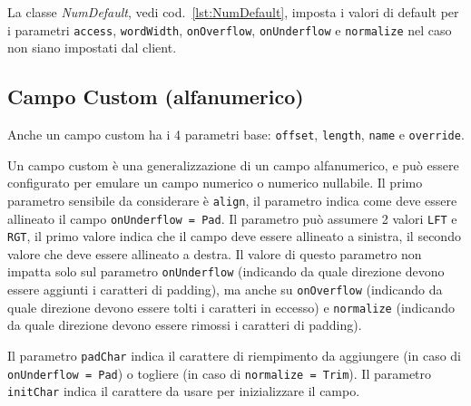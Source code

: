 \documentclass[a4paper,10pt]{report}
\begin{document}
La classe \textsl{NumDefault}, vedi cod.~\ref{lst:NumDefault}, imposta i valori
di default per i parametri \verb!access!, \verb!wordWidth!, \texttt{onOver\-flow}, 
\verb!onUnderflow! e \verb!normalize! nel caso non siano  impostati dal client.


\subsection{Campo Custom (alfanumerico)}
Anche un campo custom ha i 4 parametri base: \verb!offset!, \verb!length!,
\verb!name! e \verb!override!.

Un campo custom è una generalizzazione di un campo alfanumerico, e può essere 
configurato per emulare un campo numerico o numerico nullabile.
Il primo parametro sensibile da considerare è \verb!align!, il parametro indica
come deve essere allineato il campo \texttt{onUnderflow = Pad}.
Il parametro può assumere 2 valori \verb!LFT! e \verb!RGT!, il primo valore 
indica che il campo deve essere allineato a sinistra, il secondo valore che 
deve essere allineato a destra.
Il valore di questo parametro non impatta solo sul parametro \verb!onUnderflow!
(indicando da quale direzione devono essere aggiunti i caratteri di padding),
ma anche su \verb!onOverflow! (indicando da quale direzione devono essere tolti
i caratteri in eccesso) e \verb!normalize! (indicando da quale direzione devono
essere rimossi i caratteri di padding).

Il parametro \verb!padChar! indica il carattere di riempimento da aggiungere
(in caso di \texttt{onUnderflow = Pad}) o togliere (in caso di 
\texttt{normalize = Trim}).
Il parametro \verb!initChar! indica il carattere da usare per inizializzare il
campo.
\end{document}
